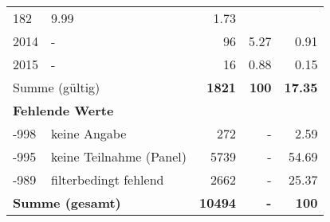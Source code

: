\begin{longtable}{lXrrr}
       \num{182} &
       \num[round-mode=places,round-precision=2]{9.99} &
         \num[round-mode=places,round-precision=2]{1.73} \\

     2014 &
     \multicolumn{1}{X}{ -  } &


       \num{96} &
       \num[round-mode=places,round-precision=2]{5.27} &
         \num[round-mode=places,round-precision=2]{0.91} \\

     2015 &
     \multicolumn{1}{X}{ -  } &


       \num{16} &
       \num[round-mode=places,round-precision=2]{0.88} &
         \num[round-mode=places,round-precision=2]{0.15} \\
     \midrule
     \multicolumn{2}{l}{Summe (gültig)} &
       \textbf{\num{1821}} &
     \textbf{\num{100}} &
       \textbf{\num[round-mode=places,round-precision=2]{17.35}} \\
     \multicolumn{5}{l}{\textbf{Fehlende Werte}}\\
       -998 &
       keine Angabe &
         \num{272} &
        - &
         \num[round-mode=places,round-precision=2]{2.59} \\
       -995 &
       keine Teilnahme (Panel) &
         \num{5739} &
        - &
         \num[round-mode=places,round-precision=2]{54.69} \\
       -989 &
       filterbedingt fehlend &
         \num{2662} &
        - &
         \num[round-mode=places,round-precision=2]{25.37} \\
     \midrule
     \multicolumn{2}{l}{\textbf{Summe (gesamt)}} &
          \textbf{\num{10494}} &
        \textbf{-} &
        \textbf{\num{100}} \\
     \bottomrule
     \end{longtable}
     
